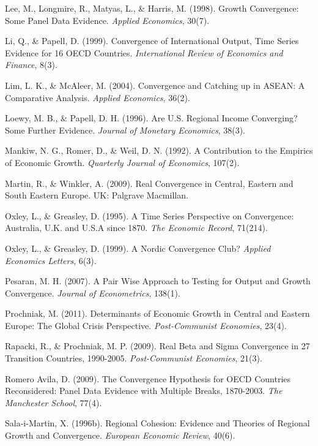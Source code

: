 \documentclass{crebsshr}
\begin{document}
\begin{thebibliography}{160}
Lee, M., Longmire, R., Matyas, L., \& Harris, M. (1998). Growth Convergence: Some Panel Data Evidence. \emph{Applied Economics}, 30(7).

Li, Q., \& Papell, D. (1999). Convergence of International Output, Time Series Evidence for 16 OECD Countries. \emph{International Review of Economics and Finance}, 8(3).

Lim, L. K., \& McAleer, M. (2004). Convergence and Catching up in ASEAN: A Comparative Analysis. \emph{Applied Economics}, 36(2).

Loewy, M. B., \& Papell, D. H. (1996). Are U.S. Regional Income Converging? Some Further Evidence. \emph{Journal of Monetary Economics}, 38(3).

Mankiw, N. G., Romer, D., \& Weil, D. N. (1992). A Contribution to the Empirics of Economic Growth. \emph{Quarterly Journal of Economics}, 107(2).

Martin, R., \& Winkler, A. (2009). Real Convergence in Central, Eastern and South Eastern Europe. UK: Palgrave Macmillan.

Oxley, L., \& Greasley, D. (1995). A Time Series Perspective on Convergence: Australia, U.K. and U.S.A since 1870. \emph{The Economic Record}, 71(214).

Oxley, L., \& Greasley, D. (1999). A Nordic Convergence Club? \emph{Applied Economics Letters}, 6(3).

Pesaran, M. H. (2007). A Pair Wise Approach to Testing for Output and Growth Convergence. \emph{Journal of Econometrics}, 138(1).

Prochniak, M. (2011). Determinants of Economic Growth in Central and Eastern Europe: The Global Crisis Perspective. \emph{Post-Communist Economies}, 23(4).

Rapacki, R., \& Prochniak, M. P. (2009). Real Beta and Sigma Convergence in 27 Transition Countries, 1990-2005. \emph{Post-Communist Economies}, 21(3).

Romero Avila, D. (2009). The Convergence Hypothesis for OECD Countries Reconsidered: Panel Data Evidence with Multiple Breaks, 1870-2003. \emph{The Manchester School}, 77(4).

Sala-i-Martin, X. (1996b). Regional Cohesion: Evidence and Theories of Regional Growth and Convergence. \emph{European Economic Review}, 40(6).


\end{thebibliography}
\end{document}
